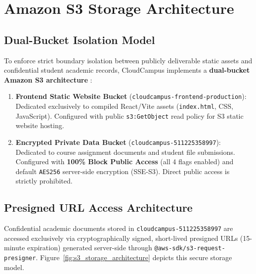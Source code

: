 \newpage
\section{Amazon S3 Storage Architecture}

\subsection{Dual-Bucket Isolation Model}
To enforce strict boundary isolation between publicly deliverable static assets and confidential student academic records, CloudCampus implements a \textbf{dual-bucket Amazon S3 architecture} \cite{aws_s3}:

\begin{enumerate}[leftmargin=*,itemsep=1pt]
    \item \textbf{Frontend Static Website Bucket} (\texttt{cloudcampus-frontend-production}): Dedicated exclusively to compiled React/Vite assets (\texttt{index.html}, CSS, JavaScript). Configured with public \texttt{s3:GetObject} read policy for S3 static website hosting.
    \item \textbf{Encrypted Private Data Bucket} (\texttt{cloudcampus-511225358997}): Dedicated to course assignment documents and student file submissions. Configured with \textbf{100\% Block Public Access} (all 4 flags enabled) and default \texttt{AES256} server-side encryption (SSE-S3). Direct public access is strictly prohibited.
\end{enumerate}

\subsection{Presigned URL Access Architecture}
Confidential academic documents stored in \texttt{cloudcampus-511225358997} are accessed exclusively via cryptographically signed, short-lived presigned URLs (15-minute expiration) generated server-side through \texttt{@aws-sdk/s3-request-presigner}. Figure~\ref{fig:s3_storage_architecture} depicts this secure storage model.

